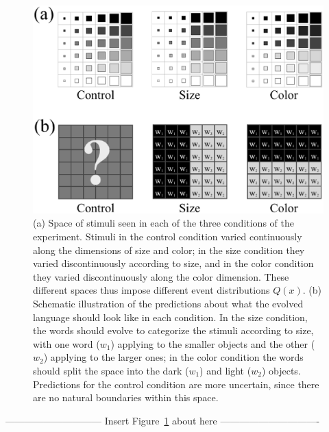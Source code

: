 \documentclass{apa}
\begin{document}
\begin{figure}
\begin{center}
\includegraphics[scale=0.45]{stimuliandpredictions.eps}
\end{center}
\caption{(a) Space of stimuli seen in each of the three conditions of the experiment. Stimuli in the {\sc control} condition varied continuously along the dimensions of size and color; in the {\sc size} condition they varied discontinuously according to size, and in the {\sc color} condition they varied discontinuously along the color dimension. These different spaces thus impose different event distributions $Q(x)$. (b) Schematic illustration of the predictions about what the evolved language should look like in each condition. In the {\sc size} condition, the words should evolve to categorize the stimuli according to size, with one word ($w_1$) applying to the smaller objects and the other ($w_2$) applying to the larger ones; in the {\sc color} condition the words should split the space into the dark ($w_1$) and light ($w_2$) objects. Predictions for the {\sc control} condition are more uncertain, since there are no natural boundaries within this space.}
\label{fig:exptstimuli}
\end{figure}

\vspace{5mm}
------------------------------ Insert Figure~\ref{fig:exptstimuli} about here -------------------------------
\vspace{5mm}
\end{document}

